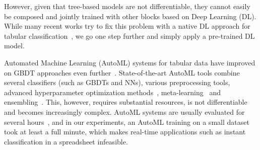 \documentclass{article}
\begin{document}
However, given that tree-based models are not differentiable, they cannot easily be composed and jointly trained with other blocks based on Deep Learning (DL).
%
While many recent works try to fix this problem with a native DL approach for tabular classification~\citep{add_lots_of_citations}, we go one step further and simply apply a pre-trained DL model.




Automated Machine Learning (AutoML) systems for tabular data have improved on GBDT approaches even 
further~\citep{thornton-kdd13a,hutter-book19a,erickson-arxiv20a}. %
State-of-the-art AutoML tools combine several classifiers (such as GBDTs and NNs), various preprocessing tools, advanced hyperparameter optimization methods~\citep{falkner-icml18a}, meta-learning~\citep{feurer-aaai15a,yang-kdd19a} and ensembling~\citep{escalante-jmlr09a,feurer-nips15a,olson-gecco16a,feurer-arxiv20v2,erickson-arxiv20a}. This, however, requires substantial resources, is not differentiable and becomes increasingly complex.
AutoML systems are usually evaluated for several hours~\citep{gijsbers-automl2019,amlb}, and in our experiments, an AutoML training on a small dataset took at least a full minute, which makes real-time applications such as instant classification in a spreadsheet infeasible.
\end{document}
